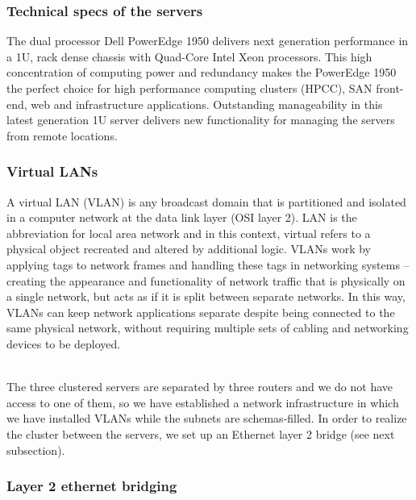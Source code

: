 \vspace{1cm}
\subsubsection{Technical specs of the servers}

The dual processor Dell PowerEdge 1950 delivers next generation performance in a 1U, rack dense chassis with Quad-Core Intel Xeon processors. This high concentration of computing power and redundancy makes the PowerEdge 1950 the perfect choice for high performance computing clusters (HPCC), SAN front-end, web and infrastructure applications. Outstanding manageability in this latest generation 1U server delivers new functionality for managing the servers from remote locations.

\pagebreak

\subsubsection{Virtual LANs}

A virtual LAN (VLAN) is any broadcast domain that is partitioned and isolated in a computer network at the data link layer (OSI layer 2). LAN is the abbreviation for local area network and in this context, virtual refers to a physical object recreated and altered by additional logic. VLANs work by applying tags to network frames and handling these tags in networking systems – creating the appearance and functionality of network traffic that is physically on a single network, but acts as if it is split between separate networks. In this way, VLANs can keep network applications separate despite being connected to the same physical network, without requiring multiple sets of cabling and networking devices to be deployed.

\\
\vspace{1cm}
The three clustered servers are separated by three routers and we do not have access to one of them, so we have established a network infrastructure in which we have installed VLANs while the subnets are schemas-filled. In order to realize the cluster between the servers, we set up an Ethernet layer 2 bridge (see next subsection).

\vspace{1cm}
\subsubsection{Layer 2 ethernet bridging}


